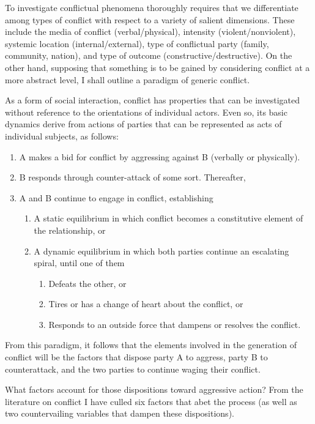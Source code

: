 To investigate conflictual phenomena thoroughly requires that we differentiate among types of conflict with respect to a variety of salient dimensions. These include the media of conflict (verbal/physical), intensity (violent/nonviolent), systemic location (internal/external), type of conflictual party (family, community, nation), and type of outcome (constructive/destructive). On the other hand, supposing that something is to be gained by considering conflict at a more abstract level, I shall outline a paradigm of generic conflict.

As a form of social interaction, conflict has properties that can be investigated without reference to the orientations of individual actors. Even so, its basic dynamics derive from actions of parties that can be represented as acts of individual subjects, as follows:

\begin{enumerate}
\item A makes a bid for conflict by aggressing against B (verbally or physically).
\item B responds through counter-attack of some sort. Thereafter,
\item A and B continue to engage in conflict, establishing
\begin{enumerate}
\item A static equilibrium in which conflict becomes a constitutive element of the relationship, or
\item A dynamic equilibrium in which both parties continue an escalating spiral, until one of them
\begin{enumerate}
\item Defeats the other, or
\item Tires or has a change of heart about the conflict, or
\item Responds to an outside force that dampens or resolves the conflict.
\end{enumerate}
\end{enumerate}
\end{enumerate}

From this paradigm, it follows that the elements involved in the generation of conflict will be the factors that dispose party A to aggress, party B to counterattack, and the two parties to continue waging their conflict.

What factors account for those dispositions toward aggressive action? From the literature on conflict I have culled six factors that abet the process (as well as two countervailing variables that dampen these dispositions).

